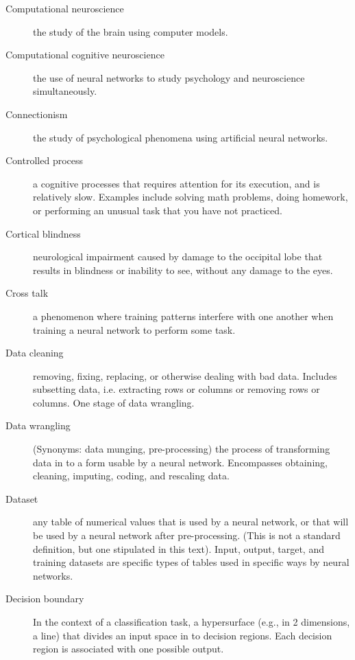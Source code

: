 \begin{description}
\item[Computational neuroscience] the study of the brain using computer models.

\item[Computational cognitive neuroscience] the use of neural networks to study psychology and neuroscience simultaneously.

\item[Connectionism] the study of psychological phenomena using artificial neural networks.

\item[Controlled process] a cognitive processes that requires attention for its execution, and is relatively slow. Examples include solving math problems, doing homework, or performing an  unusual task that you have not practiced.

\item[Cortical blindness] neurological impairment caused by damage to the occipital lobe that results in blindness or inability to see, without any damage to the eyes. 

\item[Cross talk] a phenomenon where training patterns interfere with one another when training a neural network to perform some task.

\item[Data cleaning] removing, fixing, replacing, or otherwise dealing with bad data. Includes subsetting data, i.e. extracting rows or columns or removing rows or columns. One stage of data wrangling.

\item[Data wrangling] (Synonyms: data munging, pre-processing) the process of transforming data in to a form usable by a neural network. Encompasses obtaining, cleaning, imputing, coding, and rescaling data. 

\item[Dataset] any table of numerical values that is used by a neural network, or that will be used by a neural network after pre-processing. (This is not a standard definition, but one stipulated in this text). Input, output, target, and training datasets are specific types of tables used in specific ways by neural networks.

\item[Decision boundary] In the context of a classification task, a hypersurface (e.g., in 2 dimensions, a line) that divides an input space in to decision regions. Each decision region is associated with one possible output.


\end{description}
